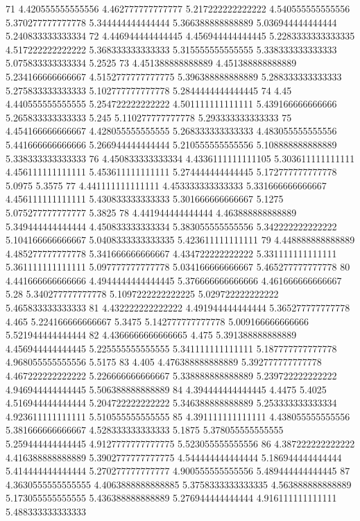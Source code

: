 71 4.420555555555556 4.462777777777777 5.217222222222222 4.540555555555556 5.370277777777778 5.344444444444444 5.366388888888889 5.036944444444444 5.240833333333334
72 4.446944444444445 4.456944444444445 5.2283333333333335 4.517222222222222 5.368333333333333 5.315555555555555 5.338333333333333 5.075833333333334 5.2525
73 4.451388888888889 4.451388888888889 5.234166666666667 4.5152777777777775 5.396388888888889 5.288333333333333 5.275833333333333 5.102777777777778 5.2844444444444445
74 4.45 4.440555555555555 5.254722222222222 4.501111111111111 5.439166666666666 5.265833333333333 5.245 5.110277777777778 5.293333333333333
75 4.454166666666667 4.428055555555555 5.268333333333333 4.483055555555556 5.441666666666666 5.266944444444444 5.210555555555556 5.108888888888889 5.338333333333333
76 4.450833333333334 4.4336111111111105 5.303611111111111 4.456111111111111 5.453611111111111 5.274444444444445 5.172777777777778 5.0975 5.3575
77 4.441111111111111 4.453333333333333 5.331666666666667 4.456111111111111 5.430833333333333 5.301666666666667 5.1275 5.075277777777777 5.3825
78 4.441944444444444 4.463888888888889 5.349444444444444 4.450833333333334 5.383055555555556 5.342222222222222 5.104166666666667 5.0408333333333335 5.423611111111111
79 4.448888888888889 4.485277777777778 5.341666666666667 4.434722222222222 5.331111111111111 5.361111111111111 5.097777777777778 5.034166666666667 5.465277777777778
80 4.441666666666666 4.4944444444444445 5.376666666666666 4.461666666666667 5.28 5.340277777777778 5.1097222222222225 5.029722222222222 5.465833333333333
81 4.432222222222222 4.491944444444444 5.365277777777778 4.465 5.224166666666667 5.3475 5.142777777777778 5.009166666666666 5.521944444444444
82 4.4366666666666665 4.475 5.391388888888889 4.456944444444445 5.225555555555555 5.341111111111111 5.187777777777778 4.968055555555556 5.5175
83 4.405 4.476388888888889 5.392777777777778 4.467222222222222 5.226666666666667 5.338888888888889 5.239722222222222 4.946944444444445 5.506388888888889
84 4.394444444444445 4.4475 5.4025 4.516944444444444 5.204722222222222 5.346388888888889 5.253333333333334 4.923611111111111 5.510555555555555
85 4.391111111111111 4.438055555555556 5.381666666666667 4.528333333333333 5.1875 5.378055555555555 5.259444444444445 4.9127777777777775 5.523055555555556
86 4.387222222222222 4.416388888888889 5.3902777777777775 4.544444444444444 5.186944444444444 5.414444444444444 5.270277777777777 4.900555555555556 5.489444444444445
87 4.3630555555555555 4.4063888888888885 5.3758333333333335 4.563888888888889 5.173055555555555 5.436388888888889 5.276944444444444 4.916111111111111 5.488333333333333
